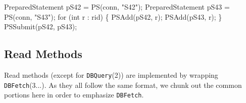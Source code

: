 \documentclass{article}
\def\nwendcode{\endtrivlist \endgroup}      %
\let\nwdocspar=\par
\theoremstyle{definition}                   %
\begin{document}
PreparedStatement pS42 = PS(conn, "S42");
PreparedStatement pS43 = PS(conn, "S43");
for (int r : rid) \{
  PSAdd(pS42, r);
  PSAdd(pS43, r);
\}
PSSubmit(pS42, pS43);
\nwendcode{}\nwdocspar

\subsection{Read Methods}
\label{sec:read-methods}
Read methods (except for {\tt{}DBQuery}(2)) are implemented by wrapping
{\tt{}\protect{}DBFetch}(3...). As they all follow the same format, we chunk out the
common portions here in order to emphasize {\tt{}\protect{}DBFetch}.
\end{document}
